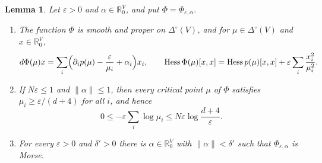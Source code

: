 \documentclass[11pt]{article}
\newtheorem{lemma}[theorem]{Lemma}
\theoremstyle{definition}
\numberwithin{equation}{section}
\newcommand{\R}{\mathbb R}
\DeclareMathOperator{\Hess}{Hess}
\begin{document}
\begin{lemma}\label{lem:barrier}
Let $\varepsilon>0$ and $\alpha\in\R^V_0$, and put $\Phi=\Phi_{\varepsilon,\alpha}$.
\begin{enumerate}[label=\textup{(\alph*)}]
\item The function $\Phi$ is smooth and proper on $\Delta^\circ(V)$, and for $\mu\in\Delta^\circ(V)$ and $x\in\R^V_0$,
\begin{equation*}
 d\Phi(\mu)x=\sum_i\Bigl(\partial_ip(\mu)-\frac\varepsilon{\mu_i}+\alpha_i\Bigr)x_i,\qquad
 \Hess\Phi(\mu)[x,x]=\Hess p(\mu)[x,x]+\varepsilon\sum_i\frac{x_i^2}{\mu_i^2}.
\end{equation*}
\item If $N\varepsilon\le1$ and $\|\alpha\|\le1$, then every critical point $\mu$ of $\Phi$ satisfies $\mu_i\ge\varepsilon/(d+4)$ for all $i$, and hence
\begin{equation*}
 0\le-\varepsilon\sum_i\log\mu_i\le N\varepsilon\log\frac{d+4}\varepsilon.
\end{equation*}
\item For every $\varepsilon>0$ and $\delta'>0$ there is $\alpha\in\R^V_0$ with $\|\alpha\|<\delta'$ such that $\Phi_{\varepsilon,\alpha}$ is Morse.
\end{enumerate}
\end{lemma}
\end{document}

